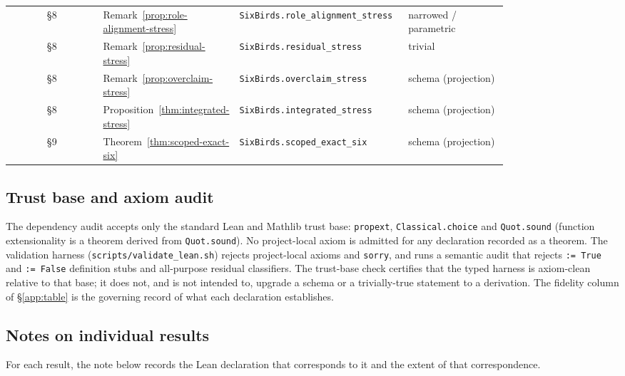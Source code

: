 \documentclass[11pt]{article}
\theoremstyle{definition}
\begin{document}
{\begin{longtable}{@{}c >{\raggedright\arraybackslash}p{0.27\linewidth} >{\raggedright\arraybackslash}p{0.34\linewidth} >{\raggedright\arraybackslash}p{0.20\linewidth}@{}}
§8 & Remark~\ref{prop:role-alignment-stress} & \texttt{SixBirds.\allowbreak role\_\allowbreak alignment\_\allowbreak stress} & narrowed / parametric \\
§8 & Remark~\ref{prop:residual-stress} & \texttt{SixBirds.\allowbreak residual\_\allowbreak stress} & trivial \\
§8 & Remark~\ref{prop:overclaim-stress} & \texttt{SixBirds.\allowbreak overclaim\_\allowbreak stress} & schema (projection) \\
§8 & Proposition~\ref{thm:integrated-stress} & \texttt{SixBirds.\allowbreak integrated\_\allowbreak stress} & schema (projection) \\
§9 & Theorem~\ref{thm:scoped-exact-six} & \texttt{SixBirds.\allowbreak scoped\_\allowbreak exact\_\allowbreak six} & schema (projection) \\
\bottomrule
\end{longtable}
}

\subsection{Trust base and axiom audit}\label{app:trust-base}

The dependency audit accepts only the standard Lean and Mathlib trust base:
\texttt{propext}, \texttt{Classical.choice} and \texttt{Quot.sound}
(function extensionality is a theorem derived from \texttt{Quot.sound}). No project-local axiom is
admitted for any declaration recorded as a theorem. The validation harness
(\texttt{scripts/validate\_lean.sh}) rejects project-local axioms and
\texttt{sorry}, and runs a semantic audit that rejects \texttt{:= True} and
\texttt{:= False} definition stubs and all-purpose residual classifiers. The
trust-base check certifies that the typed harness is axiom-clean relative to that
base; it does not, and is not intended to, upgrade a schema or a trivially-true
statement to a derivation. The fidelity column of \S\ref{app:table} is the
governing record of what each declaration establishes.

\subsection{Notes on individual results}\label{app:result-notes}

For each result, the note below records the Lean declaration that corresponds to it and the extent of that correspondence.
\end{document}

